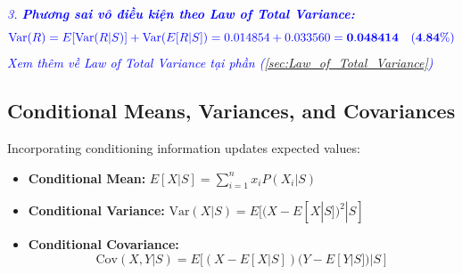 \begin{tcolorbox}
\textcolor{blue}{\textit{3. \textbf{Phương sai vô điều kiện theo Law of Total Variance:}}}
\[
\textcolor{blue}{\text{Var}(R) = E[\text{Var}(R|S)] + \text{Var}(E[R|S]) = 0.014854 + 0.033560 = \mathbf{0.048414} \quad (\mathbf{4.84\%})}
\]
\textcolor{blue}{\textit{Xem thêm về Law of Total Variance tại phần (\ref{sec:Law_of_Total_Variance})}}
\end{tcolorbox}

\subsection{Conditional Means, Variances, and Covariances}
	\label{subsec:Conditional Means, Variances, and Covariances}
Incorporating conditioning information updates expected values:
\begin{itemize}
	\item \textbf{Conditional Mean:} $E[X|S] = \sum_{i=1}^n x_i P(X_i|S)$
	\item \textbf{Conditional Variance:} $\text{Var}(X|S) = E[(X - E[X|S])^2 | S]$
	\item \textbf{Conditional Covariance:}
	\begin{equation}
		\text{Cov}(X, Y | S) = E[(X - E[X|S])(Y - E[Y|S]) | S]
		\label{eq:conditional_covariance_formula_m6}
	\end{equation}
\end{itemize}



